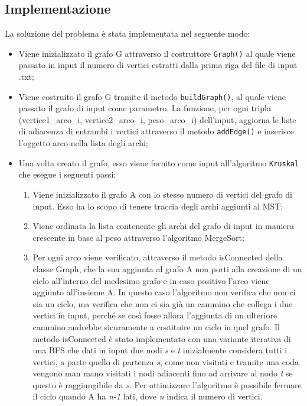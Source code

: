\subsection{Implementazione}
La soluzione del problema è stata implementata nel seguente modo:
\begin{itemize}
	\item Viene inizializzato il grafo G attraverso il costruttore \texttt{Graph()} al quale viene passato in input il numero di vertici estratti dalla prima riga del file di input .txt;
	\item Viene costruito il grafo G tramite il metodo \texttt{buildGraph()}, al quale viene passato il grafo di input come parametro. La funzione, per ogni tripla (vertice1\_arco\_i, vertice2\_arco\_i, peso\_arco\_i) dell'input, aggiorna le liste di adiacenza di entrambi i vertici attraverso il metodo \texttt{addEdge()} e inserisce l'oggetto arco nella lista degli archi; 
	\item Una volta creato il grafo, esso viene fornito come input all'algoritmo \texttt{Kruskal} che esegue i seguenti passi:
	\begin{enumerate}
		\item Viene inizializzato il grafo A con lo stesso numero di vertici del grafo di input. Esso ha lo scopo di tenere traccia degli archi aggiunti al MST;
		\item Viene ordinata la lista contenente gli archi del grafo di input in maniera crescente in base al peso attraverso l'algoritmo MergeSort;
		\item Per ogni arco viene verificato, attraverso il metodo isConnected della classe Graph, che la sua aggiunta al grafo A non porti alla creazione di un ciclo all'interno del medesimo grafo e in caso positivo l'arco viene aggiunto all'insieme A. In questo caso l'algoritmo non verifica che non ci sia un ciclo, ma verifica che non ci sia già un cammino che collega i due vertici in input, perché se così fosse allora l'aggiunta di un ulteriore cammino andrebbe sicuramente a costituire un ciclo in quel grafo. Il metodo isConnected è stato implementato con una variante iterativa di una BFS che dati in input due nodi \emph{s} e \emph{t} inizialmente considera tutti i vertici, a parte quello di partenza \emph{s}, come non visitati e tramite una coda vengono man mano visitati i nodi adiacenti fino ad arrivare al nodo \emph{t} se questo è raggiungibile da \emph{s}. Per ottimizzare l'algoritmo è possibile fermare il ciclo quando A ha \emph{n-1} lati, dove \emph{n} indica il numero di vertici.
	\end{enumerate}
\end{itemize}

